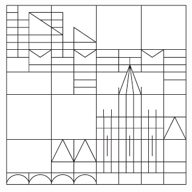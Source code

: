 \begin{titlepage}
{\begin{center}
\begin{center}
\includegraphics[scale=0.5]{figures/signet} %
\end{center}
  
\title{}
\date{}
\end{center}
}
\end{titlepage}




